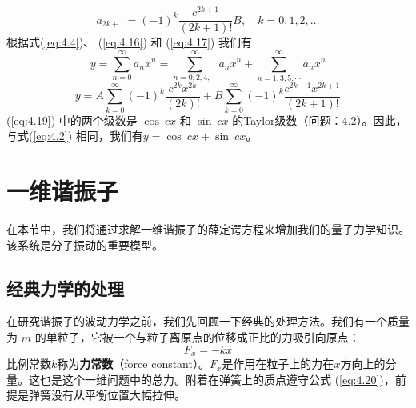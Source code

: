     \begin{equation}
        a_{2k+1} = (-1)^k \frac{c^{2k+1}}{(2k+1)!}B, \quad k = 0, 1, 2, \ldots
        \label{eq:4.17}
    \end{equation}
    根据式(\ref{eq:4.4})、 (\ref{eq:4.16}) 和 (\ref{eq:4.17}) 我们有
    \begin{equation}
        y = \sum_{n=0}^{\infty}a_nx^n = \sum_{n=0,2,4, \cdots}^{\infty}a_nx^n + \sum_{n=1,3,5, \cdots}^{\infty}a_nx^n
        \label{eq:4.18}
    \end{equation}
    \begin{equation}
        y = A\sum_{k=0}^{\infty}(-1)^k\frac{c^{2k}x^{2k}}{(2k)!} + B\sum_{k=0}^{\infty}(-1)^k\frac{c^{2k+1}x^{2k+1}}{(2k+1)!}
        \label{eq:4.19}
    \end{equation}
    (\ref{eq:4.19}) 中的两个级数是 $\cos\: cx$ 和 $\sin\: cx$ 的Taylor级数（问题：4.2）。因此，与式(\ref{eq:4.2}) 相同，我们有$y = \cos\: cx + \sin\: cx$。

\section{一维谐振子}
\label{sec:4.2 The One-Dimensional Harmonic Oscillator}
    在本节中，我们将通过求解一维谐振子的薛定谔方程来增加我们的量子力学知识。该系统是分子振动的重要模型。
    
\subsection*{经典力学的处理}
    在研究谐振子的波动力学之前，我们先回顾一下经典的处理方法。我们有一个质量为 $m$ 的单粒子，它被一个与粒子离原点的位移成正比的力吸引向原点：
    \begin{equation}
        F_x = -kx
        \label{eq:4.20}
    \end{equation}
    比例常数$k$称为\textbf{力常数}（force constant）。$F_x$是作用在粒子上的力在$x$方向上的分量。这也是这个一维问题中的总力。附着在弹簧上的质点遵守公式 (\ref{eq:4.20})，前提是弹簧没有从平衡位置大幅拉伸。

